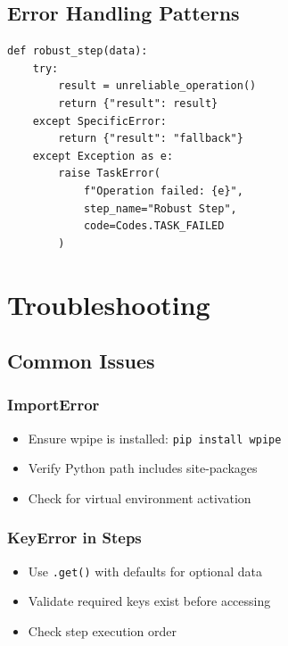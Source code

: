 \documentclass[12pt,a4paper]{report}
\newcommand{\code}[1]{\texttt{\fontfamily{pcr}\selectfont #1}}
\begin{document}
\section{Error Handling Patterns}

\begin{lstlisting}[caption={Error Handling Pattern}, label={lst:error-pattern}]
def robust_step(data):
    try:
        result = unreliable_operation()
        return {"result": result}
    except SpecificError:
        return {"result": "fallback"}
    except Exception as e:
        raise TaskError(
            f"Operation failed: {e}",
            step_name="Robust Step",
            code=Codes.TASK_FAILED
        )
\end{lstlisting}

\chapter{Troubleshooting}
\cleardoublepage

\section{Common Issues}

\subsection{ImportError}

\begin{itemize}
    \item Ensure wpipe is installed: \code{pip install wpipe}
    \item Verify Python path includes site-packages
    \item Check for virtual environment activation
\end{itemize}

\subsection{KeyError in Steps}

\begin{itemize}
    \item Use \code{.get()} with defaults for optional data
    \item Validate required keys exist before accessing
    \item Check step execution order
\end{itemize}
\end{document}

